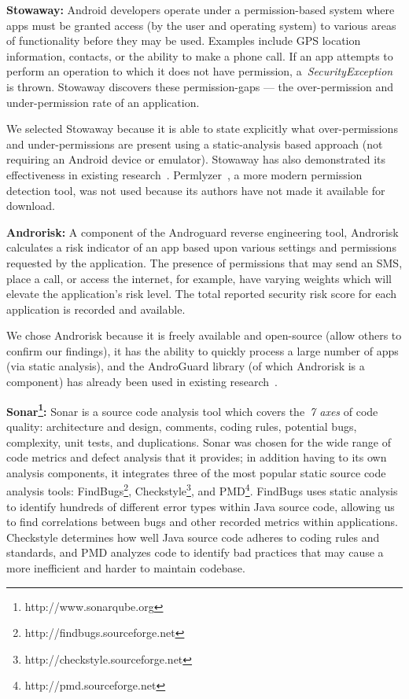 \documentclass[conference]{IEEEtran}
\begin{document}
\textbf{Stowaway:} Android developers operate under a permission-based system where apps must be granted access (by the user and operating system) to various areas of functionality before they may be used. Examples include GPS location information, contacts, or the ability to make a phone call. If an app attempts to perform an operation to which it does not have permission, a~\emph{SecurityException} is thrown. Stowaway discovers these permission-gaps --- the over-permission and under-permission rate of an application.


We selected Stowaway because it is able to state explicitly what over-permissions and under-permissions are present using a static-analysis based approach (not requiring an Android device or emulator). Stowaway has also demonstrated its effectiveness in existing research~\cite{Felt:2011:APD:2046707.2046779}. Permlyzer~\cite{6698893}, a more modern permission detection tool, was not used because its authors have not made it available for download.

\textbf{Androrisk:} A component of the Androguard reverse engineering tool, Androrisk calculates a risk indicator of an app  based upon various settings and permissions requested by the application. The presence of permissions that may send an SMS, place a call, or access the internet, for example, have varying weights which will elevate the application's risk level. The total reported security risk score for each application is recorded and available.

We chose Androrisk because it is freely available and open-source (allow others to confirm our findings), it has the ability to quickly process a large number of apps (via static analysis), and the AndroGuard library (of which Androrisk is a component) has already been used in existing research~\cite{Egele:2013:ESC:2508859.2516693}.


\textbf{Sonar\footnote{http://www.sonarqube.org}:} Sonar is a source code analysis tool which covers the~\emph{7 axes} of code quality: architecture and design, comments, coding rules, potential bugs, complexity, unit tests, and duplications. Sonar was chosen for the wide range of code metrics and defect analysis that it provides; in addition having to its own analysis components, it integrates three of the most popular static source code analysis tools: FindBugs\footnote{http://findbugs.sourceforge.net}, Checkstyle\footnote{http://checkstyle.sourceforge.net}, and PMD\footnote{http://pmd.sourceforge.net}. FindBugs uses static analysis to identify hundreds of different error types within Java source code, allowing us to find correlations between bugs and other recorded metrics within applications. Checkstyle determines how well Java source code adheres to coding rules and standards, and PMD analyzes code to identify bad practices that may cause a more inefficient and harder to maintain codebase. \\
\end{document}
